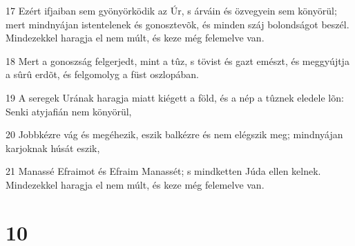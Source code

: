 \par 17 Ezért ifjaiban sem gyönyörködik az Úr, s árváin és özvegyein sem könyörül; mert mindnyájan istentelenek és gonosztevõk, és minden száj bolondságot beszél. Mindezekkel haragja el nem múlt, és keze még felemelve van.
\par 18 Mert a gonoszság felgerjedt, mint a tûz, s tövist és gazt emészt, és meggyújtja a sûrû erdõt, és felgomolyg a füst oszlopában.
\par 19 A seregek Urának haragja miatt kiégett a föld, és a nép a tûznek eledele lõn: Senki atyjafián  nem könyörül,
\par 20 Jobbkézre vág és megéhezik, eszik balkézre és nem elégszik meg; mindnyájan karjoknak húsát eszik,
\par 21 Manassé Efraimot és Efraim Manassét; s mindketten Júda ellen kelnek. Mindezekkel haragja el nem múlt, és keze még felemelve van.

\chapter{10}

